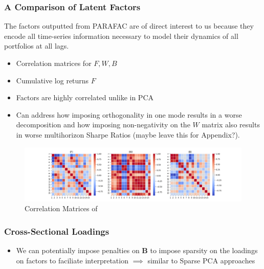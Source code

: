 \documentclass{article}
\begin{document}
\subsubsection{A Comparison of Latent Factors}

The factors outputted from PARAFAC are of direct interest to us because they encode all time-series information 
necessary to model their dynamics of all portfolios at all lags.

\begin{itemize}
    \item Correlation matrices for $F, W, B$
    \item Cumulative log returns $F$
    \item Factors are highly correlated unlike in PCA
    \item Can address how imposing orthogonality in one mode results in a worse decomposition 
    and how imposing non-negativity on the $W$ matrix also results in worse multihorizon Sharpe Ratios (maybe leave this for Appendix?). 
\end{itemize}

\begin{figure}[H]
    \centering
    \includegraphics[width=1\linewidth]{corr.png}
    \caption{Correlation Matrices of }
    \label{fig:corr}
\end{figure}

\subsubsection{Cross-Sectional Loadings}

\begin{itemize}
    \item We can potentially impose penalties on $\bm{B}$ to impose sparsity on the loadings on factors to faciliate interpretation $\implies$ 
    similar to Sparse PCA approaches
\end{itemize}
\end{document}
